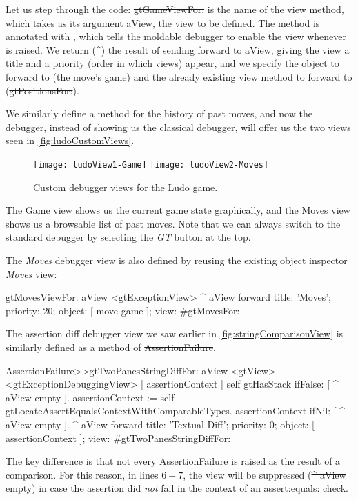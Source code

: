 \documentclass[sigplan,anonymous,review,10pt]{acmart}
\newcommand\steve[1]{\nbc{Steven}{#1}{red}} %
\newcommand\ab[1]{\nbc{Alex}{#1}{violet}} %
\newcommand\lmaf{\lst{Ludo\-Move\-Assert\-ion\-Fail\-ure}\xspace}
\begin{document}
Let us step through the code: \st{gtGameViewFor:} is the name of the view method, which takes as its argument \st{aView}, the view to be defined.
The method is annotated with , which tells the moldable debugger to enable the view whenever \lmaf is raised.
We return (\st{^}) the result of sending \st{forward} to \st{aView}, giving the view a title and a priority (order in which views) appear, and we specify the object to forward to (the move's \st{game}) and the already existing view method to forward to (\st{gtPositionsFor:}).

We similarly define a method for the history of past moves, and now the debugger, instead of showing us the classical debugger, will offer us the two views seen in \autoref{fig:ludoCustomViews}.
\begin{figure}[h]
  \texttt{[image: ludoView1-Game]}
  \texttt{[image: ludoView2-Moves]}
  \caption{Custom debugger views for the Ludo game.}
  \label{fig:ludoCustomViews}
\end{figure}
The Game view shows us the current game state graphically, and the Moves view shows us a browsable list of past moves.
Note that we can always switch to the standard debugger by selecting the \emph{GT} button at the top.

The \emph{Moves} debugger view is also defined by reusing the existing object inspector \emph{Moves} view:
\begin{code}
gtMovesViewFor: aView
	<gtExceptionView>
	^ aView forward
		title: 'Moves';
		priority: 20;
		object: [ move game ];
		view: #gtMovesFor:
\end{code}

The assertion diff debugger view we saw earlier in \autoref{fig:stringComparisonView} is similarly defined as a method of \st{AssertionFailure}.
\begin{code}
AssertionFailure>>gtTwoPanesStringDiffFor: aView
	<gtView>
	<gtExceptionDebuggingView>
	| assertionContext |
	self gtHasStack ifFalse: [ ^ aView empty ].
	assertionContext := self gtLocateAssertEqualsContextWithComparableTypes.
	assertionContext ifNil: [ ^ aView empty ].
	^ aView forward
		title: 'Textual Diff';
		priority: 0;
		object: [ assertionContext ];
		view: #gtTwoPanesStringDiffFor:
\end{code}
The key difference is that not every \st{AssertionFailure} is raised as the result of a comparison.
For this reason, in lines $6-7$, the view will be suppressed (\st{^ aView empty}) in case the assertion did \emph{not} fail in the context of an \st{assert:equals:} check.
\end{document}
